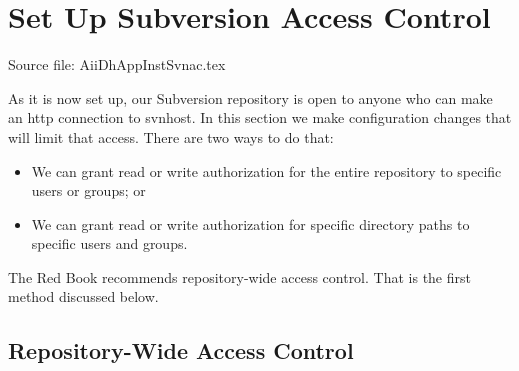 
\section{Set Up Subversion Access Control}

Source file: AiiDhAppInstSvnac.tex


As it is now set up, our Subversion repository is open to anyone who can
make an http connection to svnhost.  In this section we make configuration
changes that will limit that access.  There are two ways to do that:
\begin{itemize}
\item
We can grant read or write authorization for the entire repository 
to specific users or groups; or
\item
We can grant read or write authorization for specific directory
paths to specific users and groups.
\end{itemize}

The Red Book recommends repository-wide access control.  That is
the first method discussed below.

\subsection{Repository-Wide Access Control}


